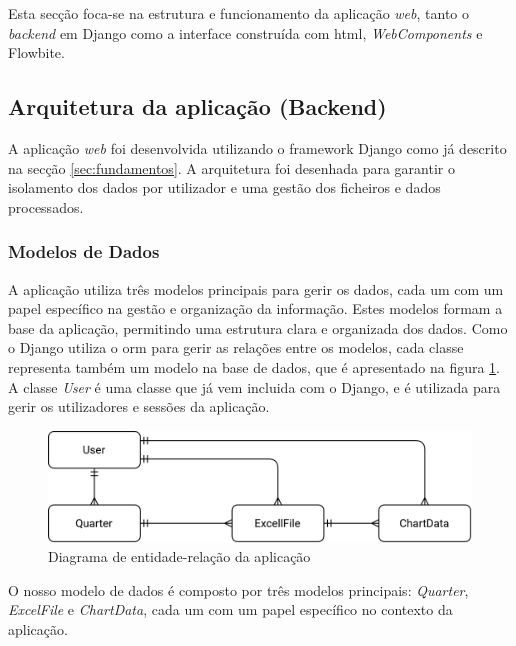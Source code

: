 Esta secção foca-se na estrutura e funcionamento da aplicação \textit{web}, tanto o \textit{backend} em Django como a interface construída com \gls{html}, \textit{WebComponents} e Flowbite.

\subsection{Arquitetura da aplicação (Backend)}

A aplicação \textit{web} foi desenvolvida utilizando o framework Django como já descrito na secção \ref{sec:fundamentos}. A arquitetura foi desenhada para garantir o isolamento dos dados por utilizador e uma gestão dos ficheiros e dados processados.

\subsubsection{Modelos de Dados}

A aplicação utiliza três modelos principais para gerir os dados, cada um com um papel específico na gestão e organização da informação. Estes modelos formam a base da aplicação, permitindo uma estrutura clara e organizada dos dados. Como o Django utiliza o \gls{orm} para gerir as relações entre os modelos, cada classe representa também um modelo na base de dados, que é apresentado na figura \ref{fig:er-diagram}. A classe \textit{User} é uma classe que já vem incluida com o Django, e é utilizada para gerir os utilizadores e sessões da aplicação.

\begin{figure}[H]
    \centering
    \includegraphics[max width=\textwidth]{./img/er-diagram.png}
 \caption{Diagrama de entidade-relação da aplicação}
 \label{fig:er-diagram}
 \end{figure}


O nosso modelo de dados é composto por três modelos principais: \textit{Quarter}, \textit{ExcelFile} e \textit{ChartData}, cada um com um papel específico no contexto da aplicação.

